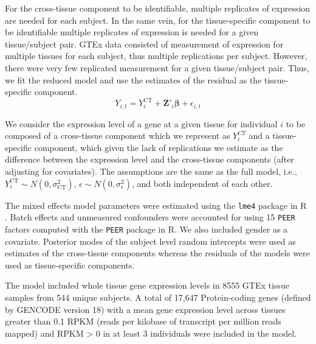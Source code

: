 \documentclass[10pt,letterpaper]{article}
\begin{document}
For the cross-tissue component to be identifiable, multiple replicates of expression are needed for each subject. In the same vein, for the tissue-specific component to be identifiable multiple replicates of expression is needed for a given tissue/subject pair. GTEx\cite{Ardlie_2015} data consisted of measurement of expression for multiple tissues for each subject, thus multiple replications per subject. However, there were very few replicated measurement for a given tissue/subject pair. Thus, we fit the reduced model and use the estimates of the residual as the tissue-specific component.
%
\[Y_{i,t} =  Y_{i}^{\text{CT}}   + \mathbf{Z}'_i \boldsymbol{\beta} + \epsilon_{i,t}  \] 
%

We consider the expression level of a gene at a given tissue for individual $i$ to be composed of a cross-tissue component which we represent as $Y_i^{CT}$ and a tissue-specific component, which given the lack of replications we estimate as the difference between the expression level and the cross-tissue components (after adjusting for covariates). The assumptions are the same as the full model, i.e., $Y_{i}^{\text{CT}} \sim N(0,\sigma_{\text{CT}}^2)$, $\epsilon \sim N(0,\sigma^2_{\epsilon})$, and both  independent of each other. 

The mixed effects model parameters were estimated using the \texttt{lme4} package \cite{Bates_2015a} in R \cite{R_Core_Team_2015}. Batch effects and unmeasured confounders were accounted for using 15 \texttt{PEER} factors computed with the \texttt{PEER} \cite{Stegle_2012} package in R. 
We also included gender as a covariate.
Posterior modes of the subject level random intercepts were used as estimates of the cross-tissue components whereas the residuals of the models were used as tissue-specific components.

The model included whole tissue gene expression levels in 8555 GTEx
tissue samples from 544 unique subjects. A total of 17,647
Protein-coding genes (defined by GENCODE \cite{Harrow_2012} version 18) with a
mean gene expression level across tissues greater than 0.1 RPKM (reads
per kilobase of transcript per million reads mapped) and RPKM \textgreater{} 0 in at least 3 individuals were included in
the model. 

\end{document}
